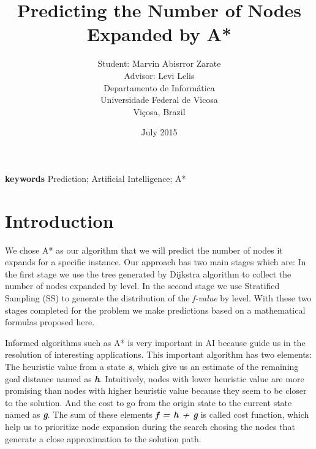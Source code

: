 \documentclass[11pt,a4paper,oneside]{report}
\begin{document}
\title{Predicting the Number of Nodes Expanded by A*}
\providecommand{\keywords}[1]{\textbf{keywords} #1}
\author{Student: Marvin Abisrror Zarate\\ Advisor: Levi Lelis \\
Departamento de Informática \\Universidade Federal de Vicosa \\Viçosa, Brazil}

\date{\color{black}July 2015}
\maketitle


\keywords{Prediction; Artificial Intelligence; A*}
\section{Introduction}
\label{sec:1}
We chose A* as our algorithm that we will predict the number of nodes it expands for a specific instance. Our approach has two main stages which are: In the first stage we use the tree generated by Dijkstra algorithm to collect the number of nodes expanded by level. In the second stage we use Stratified Sampling (SS) to generate the distribution of the \textit{f-value} by level.  With these two stages completed for the problem we make predictions based on a mathematical formulas proposed here.\newline


Informed algorithms such as A* \citep{hart1968formal} is very important in AI because guide us in the resolution of interesting applications. This important algorithm has two elements: The heuristic value from a state \textbf{\textit{s}}, which give us an estimate of the remaining goal distance named as \textbf{\textit{h}}. Intuitively, nodes with lower heuristic value are more promising than nodes with higher heuristic value because they seem to be closer to the solution.  And the cost to go from the origin state to the current state named as \textbf{\textit{g}}. The sum of these elements \textbf{\textit{f = h + g}} is called cost function, which help us to prioritize node expansion during the search chosing the nodes that generate a close approximation to the solution path.
\newline
\end{document}
